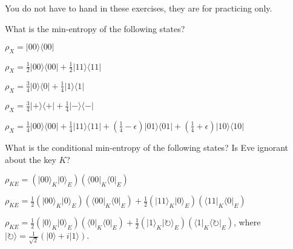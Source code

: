 \documentclass[a4paper,10pt,landscape,twocolumn]{scrartcl}
\newcommand{\ket}[1]{\lvert #1 \rangle}
\newcommand{\bra}[1]{\langle #1 \rvert}
\begin{document}
\practiceproblems

{\sffamily\noindent
You do not have to hand in these exercises, they are for practicing only. %
}

\begin{exercise}
What is the min-entropy of the following states?
\begin{subex}
$\rho_X = \ket{00}\bra{00}$
\end{subex}
\begin{subex}
$\rho_X = \frac{1}{2} \ket{00}\bra{00} + \frac{1}{2} \ket{11}\bra{11}$
\end{subex}
\begin{subex}
$\rho_X = \frac{3}{4} \ket{0}\bra{0} + \frac{1}{4} \ket{1}\bra{1}$
\end{subex}
\begin{subex}
$\rho_X = \frac{3}{4} \ket{+}\bra{+} + \frac{1}{4} \ket{-}\bra{-}$
\end{subex}
\begin{subex}
$\rho_X = \frac{1}{4} \ket{00}\bra{00} + \frac{1}{4} \ket{11}\bra{11} + \left(\frac{1}{4} - \epsilon\right) \ket{01}\bra{01} + \left(\frac{1}{4}+\epsilon\right) \ket{10}\bra{10}$
\end{subex}
\noindent What is the conditional min-entropy of the following states? Is Eve ignorant about the key $K$?
\begin{subex}
$\rho_{KE} = (\ket{00}_K \ket0_E)(\bra{00}_K\bra0_E)$
\end{subex}
\begin{subex}
$\rho_{KE} = \frac{1}{2}(\ket{00}_K \ket0_E)(\bra{00}_K\bra0_E) + \frac{1}{2}(\ket{11}_K \ket0_E)(\bra{11}_K\bra0_E)$
\end{subex}
\begin{subex}
$\rho_{KE} = \frac{1}{2} (\ket{0}_K\ket0_E)(\bra{0}_K\bra0_E) + \frac{1}{2} (\ket{1}_K\ket{\circlearrowright}_E)(\bra{1}_K\bra\circlearrowright_E)$, where $\ket{\circlearrowright} = \frac{1}{\sqrt{2}}(\ket0 + i \ket1)$.
\end{subex}
\end{exercise}
\end{document}
